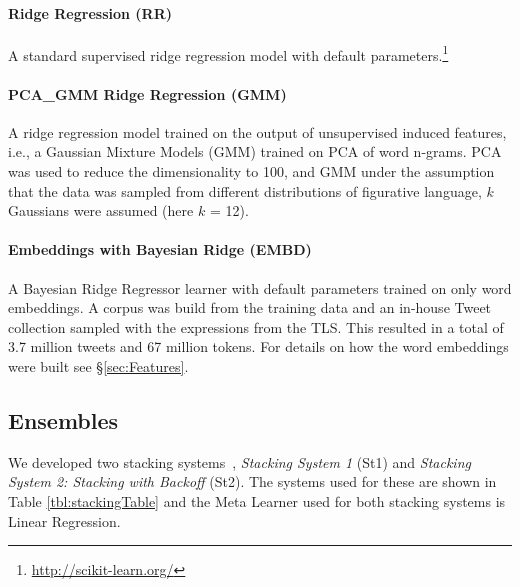 \documentclass[11pt,letterpaper]{article}
\begin{document}
\paragraph{Ridge Regression ({\sc RR})} A standard supervised ridge regression model with default parameters.\footnote{\url{http://scikit-learn.org/}}

\paragraph{PCA\_GMM Ridge Regression ({\sc GMM})} A ridge regression model trained on the output of 
unsupervised induced features, i.e., a Gaussian Mixture Models (GMM) trained on PCA of word n-grams.
PCA was used to reduce the dimensionality to 100, and GMM under the assumption that the data was sampled from different distributions of figurative language, $k$ Gaussians were assumed (here $k$ = 12). 
\paragraph{Embeddings with Bayesian Ridge ({\sc EMBD})} A Bayesian Ridge Regressor learner with default parameters trained on only word embeddings. 
A corpus was build from the training data and an in-house Tweet collection sampled with the expressions from the TLS. %
This resulted in a total of 3.7 million tweets and 67 million tokens. 
For details on how the word embeddings were built see \S\ref{sec:Features}.



\subsection{Ensembles}\label{subsec:Ensembles}
We developed two stacking systems~\cite{Wolpert:1992}, {\it Stacking System 1} ({\sc St1}) and {\it Stacking System 2: Stacking with Backoff} ({\sc St2}). The systems used for these are shown in Table  \ref{tbl:stackingTable} and the Meta Learner used for both stacking systems is Linear Regression.
\end{document}
